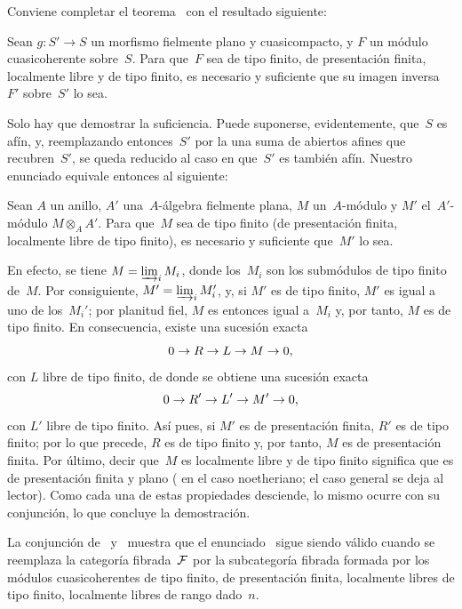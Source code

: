 Conviene completar el teorema~ con el resultado siguiente:

\begin{proposition}
\label{VIII.1.10}
%
Sean $g\colon S'\to S$ un morfismo fielmente plano y cuasicompacto, y
$F$ un módulo cuasicoherente sobre~$S$. Para que~$F$ sea de tipo finito,
\resp de presentación finita, \resp localmente libre y de tipo finito,
es necesario y suficiente que su imagen inversa $F'$ sobre~$S'$ lo sea.
\end{proposition}

Solo hay que demostrar la suficiencia. Puede suponerse, evidentemente,
que~$S$ es afín,
y, reemplazando entonces~$S'$ por
{la}
{una}
suma de abiertos afines que recubren~$S'$, se queda reducido al caso en
que~$S'$ es también afín. Nuestro enunciado equivale entonces al
siguiente:

\begin{corollaire}
\label{VIII.1.11}
Sean $A$ un anillo, $A'$ una~$A$-álgebra fielmente plana, $M$
un~$A$-módulo y $M'$ el~$A'$-módulo $M\otimes_{A}A'$. Para que~$M$ sea de
tipo finito (\resp de presentación finita, \resp localmente libre de tipo
finito), es necesario y suficiente que~$M'$ lo sea.
\end{corollaire}

En efecto, se tiene $M=\varinjlim_i M_{i}$, donde los~$M_{i}$ son los
submódulos de tipo finito de~$M$. Por consiguiente,
$M'=\varinjlim_i M_{i}'$, y, si $M'$ es de tipo finito, $M'$ es igual a
uno de los~$M_{i}'$; por planitud fiel, $M$ es entonces igual a~$M_{i}$ y,
por tanto, $M$ es de tipo finito. En consecuencia, existe una sucesión
exacta
$$
0\to R\to L\to M\to 0\quoi,
$$
con $L$ libre de tipo finito, de donde se obtiene una sucesión exacta
$$
0\to R'\to L'\to M'\to 0\quoi,
$$
con $L'$ libre de tipo finito. Así pues, si $M'$ es de presentación
finita, $R'$ es de tipo finito; por lo que precede, $R$ es de tipo finito
y, por tanto, $M$ es de presentación finita. Por último, decir que~$M$ es
localmente libre y de tipo finito significa que es de presentación
finita y plano (\cf {} en el caso noetheriano; el caso general se
deja al lector). Como cada una de estas propiedades desciende, lo mismo
ocurre con su conjunción, lo que concluye la demostración.

\begin{remarque}
\label{VIII.1.12}
La conjunción de~ y~ muestra que el
enunciado~ sigue siendo válido cuando se reemplaza la
categoría fibrada~$\cal{F}$ por la subcategoría fibrada formada por los
módulos cuasicoherentes de tipo finito, \resp de presentación finita,
\resp localmente libres de tipo finito, \resp localmente libres de rango
dado~$n$.
\end{remarque}
